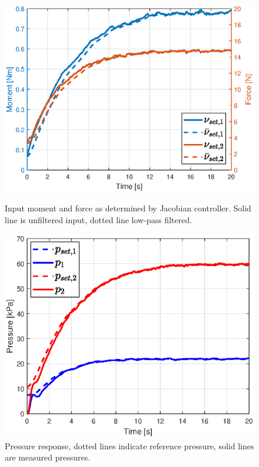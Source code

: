 \begin{figure}[H] 
    \begin{minipage}[b]{0.49\linewidth}
     \centering
    \includegraphics[width=\linewidth]{Figures/Chapter5/jacinputstepright.eps} 
    \caption{Input moment and force as determined by Jacobian controller. Solid line is unfiltered input, dotted line low-pass filtered. } 
    \label{fig5:nuright} 
       \end{minipage} 
    \begin{minipage}[b]{0.49\linewidth}
     \centering
    \includegraphics[width=\linewidth]{Figures/Chapter5/pressurestepright.eps} 
    \caption{Pressure response, dotted lines indicate reference pressure, solid lines are measured pressures.} 
    \label{fig5:pright} 
    \end{minipage} 
\end{figure}




